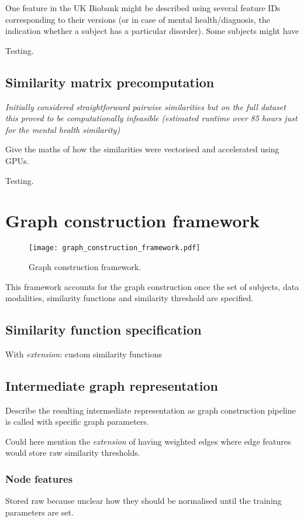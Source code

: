 One feature in the UK Biobank might be described using several feature IDs corresponding to their versions (or in case of mental health/diagnosis, the indication whether a subject has a particular disorder). Some subjects might have 

Testing.

\subsection{Similarity matrix precomputation}
\textit{Initially considered straightforward pairwise similarities but on the full dataset this proved to be computationally infeasible (estimated runtime over 85 hours just for the mental health similarity)}

Give the maths of how the similarities were vectorised and accelerated using GPUs.

Testing.

\section{Graph construction framework}

\begin{figure}[h]
    \texttt{[image: graph\_construction\_framework.pdf]}
    \caption{Graph construction framework.}\label{graph-construction-framework}
\end{figure}

This framework accounts for the graph construction once the set of subjects, data modalities, similarity functions and similarity threshold are specified.


\subsection{Similarity function specification}
With \textit{extension}: custom similarity functions


\subsection{Intermediate graph representation}
Describe the resulting intermediate representation as graph construction pipeline is called with specific graph parameters.

Could here mention the \textit{extension} of having weighted edges where edge features would store raw similarity thresholds.

\subsubsection{Node features}
Stored raw because unclear how they should be normalised until the training parameters are set.

